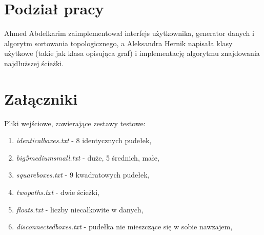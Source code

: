 \documentclass{article}
\begin{document}
\section{Podział pracy}
Ahmed Abdelkarim zaimplementował interfejs użytkownika, generator danych i algorytm sortowania topologicznego, a Aleksandra Hernik napisała klasy użytkowe (takie jak klasa opisująca graf) i implementację algorytmu znajdowania najdłuższej ścieżki.

\section{Załączniki}
Pliki wejściowe, zawierające zestawy testowe:
\begin{enumerate}
\item \textit{identical\textunderscore boxes.txt} - 8 identycznych pudełek,
\item \textit{big\textunderscore 5medium\textunderscore small.txt} - duże, 5 średnich, małe,
\item \textit{square\textunderscore boxes.txt} - 9 kwadratowych pudełek,
\item \textit{two\textunderscore paths.txt} - dwie ścieżki,
\item \textit{floats.txt} - liczby niecałkowite w danych,
\item \textit{disconnected\textunderscore boxes.txt} - pudełka nie mieszczące się w sobie nawzajem,

\end{enumerate}
\end{document}
